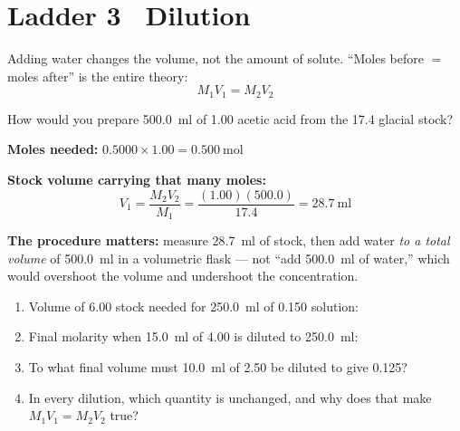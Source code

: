 \documentclass{apchem-worksheet}
\begin{document}
\section*{\sffamily Ladder 3 \textbullet\ Dilution}

Adding water changes the volume, not the amount of solute. ``Moles before
$=$ moles after'' is the entire theory:
\[ M_1 V_1 = M_2 V_2 \]

\begin{workedexample}
How would you prepare \SI{500.0}{\milli\litre} of \SI{1.00}{\Molar}
acetic acid from the \SI{17.4}{\Molar} glacial stock?

\textbf{Moles needed:} $0.5000 \times 1.00 = \SI{0.500}{\mole}$

\textbf{Stock volume carrying that many moles:}
\[ V_1 = \frac{M_2 V_2}{M_1} = \frac{(1.00)(500.0)}{17.4}
       = \SI{28.7}{\milli\litre} \]

\textbf{The procedure matters:} measure \SI{28.7}{\milli\litre} of stock,
then add water \emph{to a total volume} of \SI{500.0}{\milli\litre} in a
volumetric flask --- not ``add \SI{500.0}{\milli\litre} of water,''
which would overshoot the volume and undershoot the concentration.
\end{workedexample}

\begin{yourturn}
\begin{enumerate}[leftmargin=*,itemsep=0.5em]
  \item Volume of \SI{6.00}{\Molar}  stock needed for
        \SI{250.0}{\milli\litre} of \SI{0.150}{\Molar} solution:
        \workspace[1.6cm]
  \item Final molarity when \SI{15.0}{\milli\litre} of
        \SI{4.00}{\Molar}  is diluted to
        \SI{250.0}{\milli\litre}: \workspace[1.6cm]
  \item To what final volume must \SI{10.0}{\milli\litre} of
        \SI{2.50}{\Molar}  be diluted to give
        \SI{0.125}{\Molar}? \workspace[1.6cm]
  \item In every dilution, which quantity is unchanged, and why does that
        make $M_1V_1 = M_2V_2$ true? \workspace[1.6cm]
\end{enumerate}
\end{yourturn}
\end{document}
